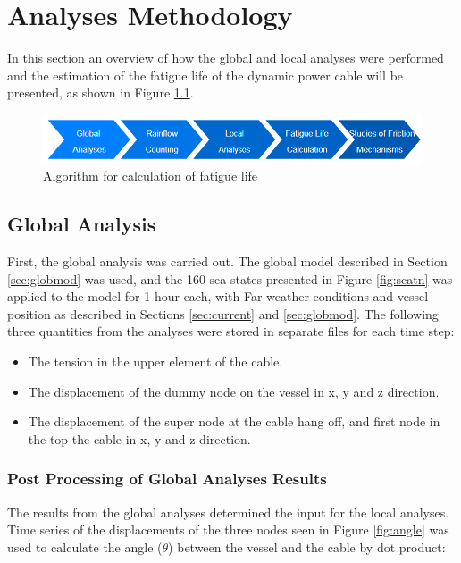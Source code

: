 \chapter{Analyses Methodology}
\label{chap:estimation}
In this section an overview of how the global and local analyses were performed and the estimation of the fatigue life of the dynamic power cable will be presented, as shown in Figure \ref{fig:aanaalg}. 
\begin{figure}[H]
\centering
\includegraphics[scale=0.73]{figures/anaaalg}
\caption[Algorithm for calculation of fatigue life ]{Algorithm for calculation of fatigue life  }
 \label{fig:aanaalg}
\end{figure}
\section{Global Analysis}
First, the global analysis was carried out. The global model described in Section \ref{sec:globmod} was used, and the 160 sea states presented in Figure \ref{fig:scatn} was applied to the model for 1 hour each, with Far weather conditions and vessel position as described in Sections \ref{sec:current} and \ref{sec:globmod}. The following three quantities from the analyses were stored in separate files for each time step:
\begin{itemize}
    \item The  tension in the upper element of the cable.
    \item The displacement of the dummy node on the vessel in x, y and z direction.
    \item The  displacement of the super node at the cable hang off, and first  node in the top the cable in x, y and z direction.
\end{itemize}

\subsection{Post Processing of Global Analyses Results}
The results from the global analyses determined the input for the local analyses. Time series of the displacements of the three nodes seen in Figure \ref{fig:angle} was used to calculate the angle ($\theta$) between the vessel and the cable by dot product: 

